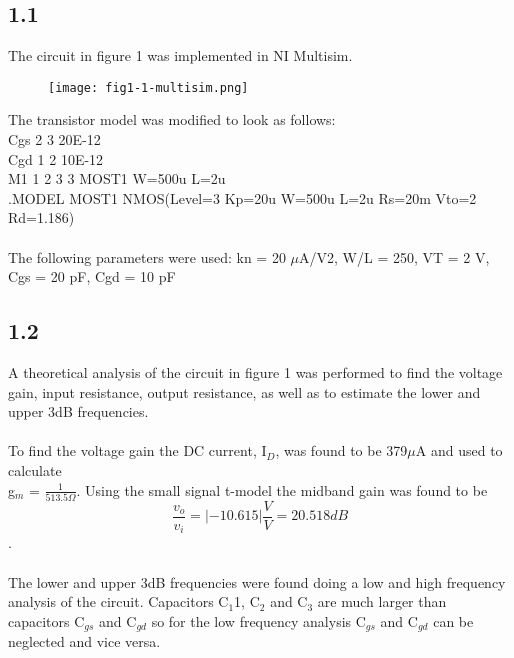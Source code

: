 \subsection*{1.1}
  The circuit in figure 1 was implemented in NI Multisim.\\

    \begin{figure}[h!]
        \centering
        \texttt{[image: fig1-1-multisim.png]}
    \end{figure} 

  The  transistor  model was modified to look as follows:\\
  Cgs  2 3 20E-12\\ 
  Cgd 1 2 10E-12\\
  M1 1 2 3 3 MOST1 W=500u L=2u\\
  .MODEL MOST1 NMOS(Level=3 Kp=20u W=500u L=2u Rs=20m Vto=2 Rd=1.186)\\\\

  The following parameters were used: kn =  20  $\mu$A/V2,  W/L =  250,  VT =  2  V,  Cgs =  20  pF, Cgd = 10 pF\\
\pagebreak
\subsection*{1.2}

  A theoretical analysis of the circuit in figure 1 was performed to find the voltage gain, input resistance, output resistance, as well as to estimate the lower and upper 3dB frequencies.\\\\

  To find the voltage gain the DC current, I$_D$, was found to be 379$\mu$A and used to calculate\\ g$_m$ = $\frac{1}{513.5 \Omega}$. Using the small signal t-model the midband gain was found to be $$\frac{v_o}{v_i} = |-10.615| \frac{V}{V} = 20.518 dB$$.\\\\

  The lower and upper 3dB frequencies were found doing a low and high frequency analysis of the circuit. Capacitors C$_1$1, C$_2$ and C$_3$ are much larger than capacitors C$_{gs}$ and C$_{gd}$ so for the low frequency analysis C$_{gs}$ and C$_{gd}$ can be neglected and vice versa.\\


